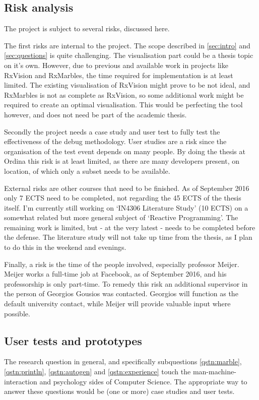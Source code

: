 \subsection{Risk analysis} The project is subject to several risks,
discussed here.

The first risks are internal to the project.  The scope described in
\autoref{sec:intro} and~%
\ref{sec:questions} is quite challenging.  The visualisation part could
be a thesis topic on it's own.  However, due to previous and available
work in projects like RxVision and RxMarbles, the time required for
implementation is at least limited.  The existing visualisation of
RxVision might prove to be not ideal, and RxMarbles is not as complete
as RxVision, so some additional work might be required to create an
optimal visualisation.  This would be perfecting the tool however, and
does not need be part of the academic thesis.

Secondly the project needs a case study and user test to fully test the
effectiveness of the debug methodology.  User studies are a risk since
the organisation of the test event depends on many people.  By doing the
thesis at Ordina this risk is at least limited, as there are many
developers present, on location, of which only a subset needs to be
available.

External risks are other courses that need to be finished.  As of
September 2016 only 7 ECTS need to be completed, not regarding the 45
ECTS of the thesis itself.  I'm currently still working on `IN4306
Literature Study' (10 ECTS) on a somewhat related but more general
subject of `Reactive Programming'.  The remaining work is limited, but -
at the very latest - needs to be completed before the defense.  The
literature study will not take up time from the thesis, as I plan to do
this in the weekend and evenings.

Finally, a risk is the time of the people involved, especially professor
Meijer.  Meijer works a full-time job at Facebook, as of September 2016,
and his professorship is only part-time.  To remedy this risk an
additional supervisor in the person of Georgios Gousios was contacted.
Georgios will function as the default university contact, while Meijer
will provide valuable input where possible.

\subsection{User tests and prototypes} The research question in general,
and specifically subquestions %
\ref{qstn:marble}, %
\ref{qstn:println}, %
\ref{qstn:autogen} and %
\ref{qstn:experience} touch the man-machine-interaction and psychology
sides of Computer Science.  The appropriate way to answer these
questions would be (one or more) case studies and user tests.

